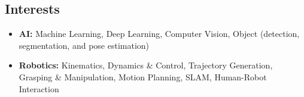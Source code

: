 \documentclass[10pt, oneside]{article} %
\begin{document}
\begin{paracol}{2}


\section{Interests}


\begin{itemize}[leftmargin=*, topsep=0pt, label={}]
	
	\item{\textbf{AI:} Machine Learning, Deep Learning, Computer Vision, Object (detection, segmentation, and pose estimation)}%
	
	\item{\textbf{Robotics:} Kinematics, Dynamics \& Control, Trajectory Generation, Grasping \& Manipulation, Motion Planning, SLAM, Human-Robot Interaction} %


\end{itemize}
\end{paracol}
\end{document}
